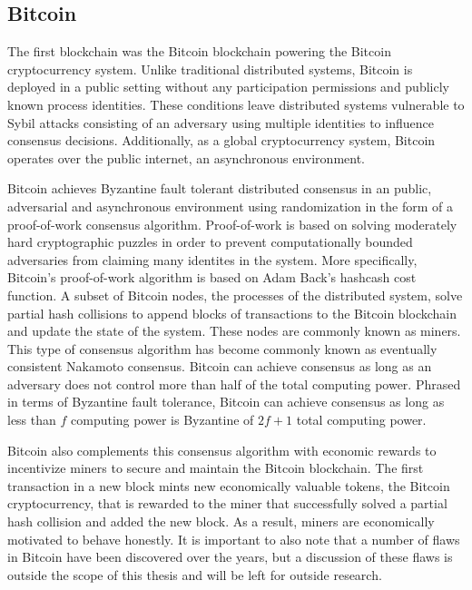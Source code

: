 \subsection{Bitcoin}

The first blockchain was the Bitcoin blockchain\cite{bitcoin} powering the
Bitcoin cryptocurrency system. Unlike traditional distributed systems, Bitcoin
is deployed in a public setting without any participation permissions and
publicly known process identities. These conditions leave distributed systems
vulnerable to Sybil attacks consisting of
an adversary using multiple identities to influence consensus
decisions\cite{sybil}. Additionally, as a global cryptocurrency system, Bitcoin
operates over the public internet, an asynchronous environment.

Bitcoin achieves Byzantine fault tolerant distributed consensus in an public, adversarial
and asynchronous environment using randomization in the form of a proof-of-work
consensus algorithm. Proof-of-work is based on solving moderately hard
cryptographic puzzles in order to prevent computationally bounded adversaries
from claiming many identites in the system\cite{anonymousByzantine}. More specifically, Bitcoin's
proof-of-work algorithm is based on Adam Back's hashcash cost function. A subset
of Bitcoin nodes, the processes of the distributed system, solve partial
hash collisions to append blocks of transactions to the Bitcoin blockchain and
update the state of the system. These nodes are commonly known as miners. This
type of consensus algorithm has become commonly known as eventually consistent
Nakamoto consensus\cite{nakamotoConsensus}. Bitcoin can achieve consensus as
long as an adversary does not control more than half of the total computing
power. Phrased in terms of Byzantine fault tolerance, Bitcoin can achieve
consensus as long as less than $f$ computing power is Byzantine of $2f + 1$
total computing power.

Bitcoin also complements this consensus algorithm with economic rewards to
incentivize miners to secure and maintain the Bitcoin blockchain. The first
transaction in a new block mints new economically valuable tokens, the Bitcoin
cryptocurrency, that is rewarded to the miner that successfully solved a partial
hash collision and added the new block\cite{bitcoin}. As a result, miners are
economically motivated to behave honestly. It is important to also note that a number of
flaws in Bitcoin have been discovered over the years, but a discussion of these
flaws is outside the scope of this thesis and will be left for outside research.

